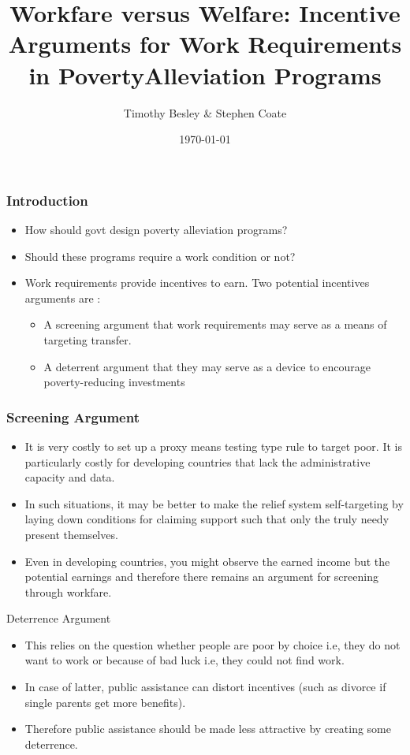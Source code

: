 \documentclass{beamer}
\begin{document}
\title{Workfare versus Welfare: Incentive Arguments for Work Requirements in PovertyAlleviation Programs}
\author{Timothy Besley \& Stephen Coate}
\date{\today}

\frame{\titlepage}


\begin{frame}
\frametitle{Introduction}
\begin{itemize}
\item How should govt design poverty alleviation programs? 
\item Should these programs require a work condition or not?
\item Work requirements provide incentives to earn. Two potential incentives arguments are :
\begin{itemize}
    \item A screening argument that work requirements may serve as a means of targeting transfer.
    \item A deterrent argument that they may serve as a device to encourage poverty-reducing investments
\end{itemize}
\end{itemize}
\end{frame}

\begin{frame}
\frametitle{Screening Argument }
\begin{itemize}
    \item It is very costly to set up a proxy means testing type rule to target poor. It is particularly costly for developing countries that lack the administrative capacity and data.
    \item In such situations, it may be better to make the relief system self-targeting by laying down conditions for claiming support such that only the truly needy present themselves.
    \item Even in developing countries, you might observe the earned income but the potential earnings and therefore there remains an argument for screening through workfare. 
  
\end{itemize}
\end{frame}

\begin{frame}{Deterrence Argument}
\begin{itemize}
    \item This relies on the question whether people are poor by choice i.e, they do not want to work or because of bad luck i.e, they could not find work. 
    \item In case of latter, public assistance can distort incentives (such as divorce if single parents get more benefits). 
    \item Therefore public assistance should be made less attractive by creating some deterrence. 
\end{itemize}
\end{frame}
\end{document}
